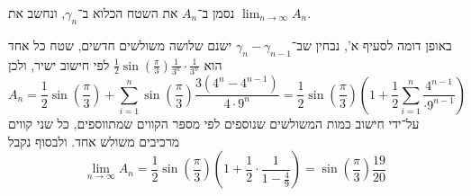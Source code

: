 \subquestion{}
נסמן ב־$A_n$ את השטח הכלוא ב־$\gamma_n$, ונחשב את $\lim_{n \to \infty} A_n$.
\begin{solution}
	באופן דומה לסעיף א', נבחין שב־$\gamma_n - \gamma_{n - 1}$ ישנם שלושה משולשים חדשים, שטח כל אחד הוא $\frac{1}{2} \sin(\frac{\pi}{3}) \frac{1}{3^n} \cdot \frac{1}{3^n}$ לפי חישוב ישיר, ולכן
	\[
		A_n = \frac{1}{2} \sin(\frac{\pi}{3}) + \sum_{i = 1}^{n} \sin(\frac{\pi}{3}) \frac{3 (4^n - 4^{n - 1})}{4 \cdot 9^n}
		= \frac{1}{2} \sin(\frac{\pi}{3}) (1 + \frac{1}{2} \sum_{i = 1}^{n} \frac{4^{n - 1} }{\cdot 9^{n - 1}})
	\]
	על־ידי חישוב כמות המשולשים שנוספים לפי מספר הקווים שמתווספים, כל שני קווים מרכיבים משולש אחד.
	ולבסוף נקבל
	\[
		\lim_{n \to \infty} A_n
		= \frac{1}{2} \sin(\frac{\pi}{3}) (1 + \frac{1}{2} \cdot \frac{1}{1 - \frac{4}{9}})
		= \sin(\frac{\pi}{3}) \frac{19}{20}
	\]
\end{solution}


